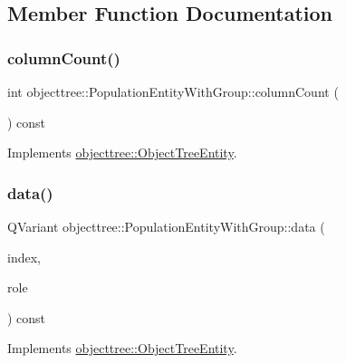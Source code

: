 \subsection{Member Function Documentation}
\mbox{\label{classobjecttree_1_1_population_entity_with_group_ad4013de31a74266b9cb7a2b4d8a083ce}} 
\subsubsection{\texorpdfstring{columnCount()}{columnCount()}}
{\footnotesize\ttfamily int objecttree\+::\+Population\+Entity\+With\+Group\+::column\+Count (\begin{DoxyParamCaption}{ }\end{DoxyParamCaption}) const\hspace{0.3cm}{\ttfamily [virtual]}}



Implements \mbox{\hyperlink{classobjecttree_1_1_object_tree_entity_a70fd25eccf88b305e9db15fbe3daeae8}{objecttree\+::\+Object\+Tree\+Entity}}.

\mbox{\label{classobjecttree_1_1_population_entity_with_group_ae087908412b8df48f88104ae1f4c8bb6}} 
\subsubsection{\texorpdfstring{data()}{data()}}
{\footnotesize\ttfamily Q\+Variant objecttree\+::\+Population\+Entity\+With\+Group\+::data (\begin{DoxyParamCaption}\item[{const Q\+Model\+Index \&}]{index,  }\item[{int}]{role }\end{DoxyParamCaption}) const\hspace{0.3cm}{\ttfamily [virtual]}}



Implements \mbox{\hyperlink{classobjecttree_1_1_object_tree_entity_a2413c6573de18b451d97eb3800f10f35}{objecttree\+::\+Object\+Tree\+Entity}}.

